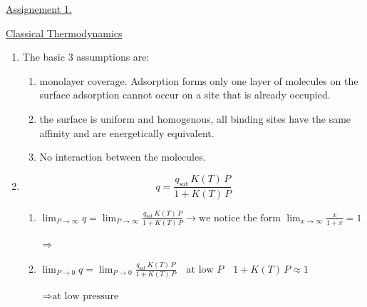 \documentclass{article}
\begin{document}
\begin{center}
    {\LARGE \underline{Assignement 1.}}
\end{center}

\vspace{0.5cm}

{\Large \underline{Classical Thermodynamics}}

\vspace{0.3cm}

\begin{enumerate}
    \item[\textbf{1.}] The basic 3 assumptions are:
    \begin{enumerate}
        \item[\textbf{1.}] monolayer coverage. Adsorption forms only one layer of molecules on the surface adsorption cannot occur on a site that is already occupied.
        \item[\textbf{2.}] the surface is uniform and homogenous, all binding sites have the same affinity and are energetically equivalent.
        \item[\textbf{3.}] No interaction between the molecules.
    \end{enumerate} 

    \item[\textbf{2.}] 
    \begin{equation*}
        q = \frac{q_{\text{sat}} \, K(T) \, P}{1 + K(T) \, P}
    \end{equation*}

    \begin{enumerate}
        \item[\textbf{a)}] $\displaystyle \lim_{P \to \infty} q = \lim_{P \to \infty} \frac{q_{\text{sat}} \, K(T) \, P}{1 + K(T) \, P} \longrightarrow \text{we notice the form } \lim_{x \to \infty} \frac{x}{1+x} = 1$
        
        \vspace{0.2cm}
        $\Rightarrow$ 

        \vspace{0.3cm}
        \item[\textbf{b)}] $\displaystyle \lim_{P \to 0} q = \lim_{P \to 0} \frac{q_{\text{sat}} \, K(T) \, P}{1 + K(T) \, P} \quad \text{at low } P \quad 1 + K(T) \, P \approx 1$

        \vspace{0.2cm}
        $\Rightarrow \text{at low pressure} \quad$ 
    \end{enumerate}


\end{enumerate}
\end{document}
